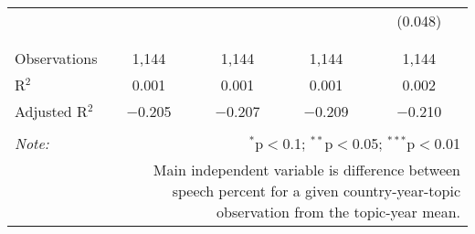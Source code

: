\begin{table}[!htbp]
\begin{tabular}{@{\extracolsep{5pt}}lcccc}
  &  &  &  & (0.048) \\ 
  & & & & \\ 
\hline \\[-1.8ex] 
Observations & 1,144 & 1,144 & 1,144 & 1,144 \\ 
R$^{2}$ & 0.001 & 0.001 & 0.001 & 0.002 \\ 
Adjusted R$^{2}$ & $-$0.205 & $-$0.207 & $-$0.209 & $-$0.210 \\ 
\hline 
\hline \\[-1.8ex] 
\textit{Note:}  & \multicolumn{4}{r}{$^{*}$p$<$0.1; $^{**}$p$<$0.05; $^{***}$p$<$0.01} \\ 
 & \multicolumn{4}{r}{Main independent variable is difference between speech percent for a given country-year-topic observation from the topic-year mean.} \\ 
\end{tabular} 
\end{table} 
